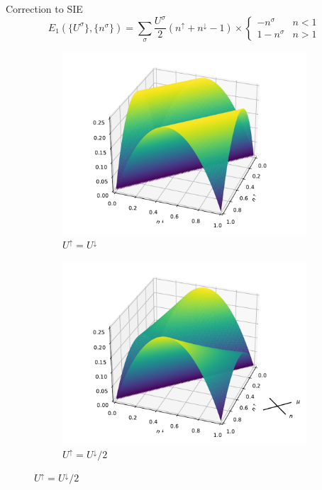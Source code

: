 \documentclass[xcolor=table,aspectratio=169]{beamer}
\numberwithin{equation}{section}
\begin{document}
\begin{frame}{Correction to SIE}
    \begin{equation}
        E_1(\{U^\sigma\}, \{n^\sigma\}) =
        \sum_\sigma \frac{U^\sigma}{2} \left(n^\uparrow + n^\downarrow - 1\right) \times
        \begin{cases}
            -n^\sigma    & n < 1 \\
            1 - n^\sigma & n > 1
        \end{cases}
        \label{eqn:novel_u_correction}
    \end{equation}
    \begin{figure}[t!]
        \begin{subfigure}[b]{0.4\columnwidth}
            \includegraphics[width=\columnwidth]{figures/novel_u_correction_equal.pdf}
            \caption{$U^\uparrow = U^\downarrow$}
        \end{subfigure}
        \begin{subfigure}[b]{0.4\columnwidth}
            \includegraphics[width=\columnwidth]{figures/novel_u_correction.pdf}
            \caption{$U^\uparrow = U^\downarrow/2$}
        \end{subfigure}
    \end{figure}
\end{frame}
\end{document}
